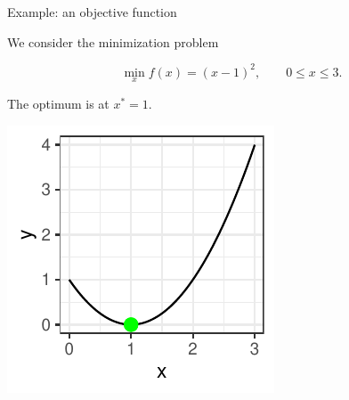 \begin{frame}{Example: an objective function}

We consider the minimization problem

$$
\min_{x} f(x) = (x - 1)^2, \qquad 0 \le x \le 3.
$$

The optimum is at $x^* = 1$.

\vspace*{0.1cm}


\centering \includegraphics[width=0.5\linewidth,height=0.5\textheight]{images/expedia-6-1}


\end{frame}

